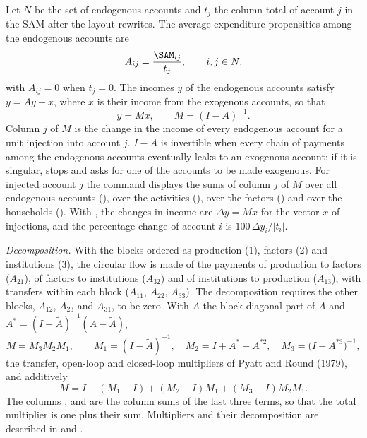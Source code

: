 
Let $N$ be the set of endogenous accounts and $t_j$ the column total of
account $j$ in the SAM after the layout rewrites. The average expenditure
propensities among the endogenous accounts are
\begin{equation*}
A_{ij} = \frac{\SAM_{ij}}{t_j}, \qquad i, j \in N,
\end{equation*}
with $A_{ij} = 0$ when $t_j = 0$. The incomes $y$ of the endogenous accounts
satisfy $y = A y + x$, where $x$ is their income from the exogenous accounts,
so that
\begin{equation*}
y = M x, \qquad M = (I - A)^{-1}.
\end{equation*}
Column $j$ of $M$ is the change in the income of every endogenous account for
a unit injection into account $j$. $I - A$ is invertible when every chain of
payments among the endogenous accounts eventually leaks to an exogenous
account; if it is singular,  stops and asks for one of the
accounts to be made exogenous. For injected account $j$ the command displays
the sums of column $j$ of $M$ over all endogenous accounts (), over
the activities (), over the factors () and over the
households (). With , the changes
in income are $\Delta y = M x$ for the vector $x$ of injections, and the
percentage change of account $i$ is $100\, \Delta y_i / |t_i|$.

\textit{Decomposition.} With the blocks ordered as production (1), factors (2)
and institutions (3), the circular flow is made of the payments of production
to factors ($A_{21}$), of factors to institutions ($A_{32}$) and of
institutions to production ($A_{13}$), with transfers within each block
($A_{11}$, $A_{22}$, $A_{33}$). The decomposition requires the other blocks,
$A_{12}$, $A_{23}$ and $A_{31}$, to be zero. With $\tilde A$ the
block-diagonal part of $A$ and $A^* = (I - \tilde A)^{-1}(A - \tilde A)$,
\begin{equation*}
M = M_3 M_2 M_1, \qquad M_1 = (I - \tilde A)^{-1}, \quad
M_2 = I + A^* + A^{*2}, \quad M_3 = \bigl(I - A^{*3}\bigr)^{-1},
\end{equation*}
the transfer, open-loop and closed-loop multipliers of Pyatt and Round (1979),
and additively
\begin{equation*}
M = I + (M_1 - I) + (M_2 - I) M_1 + (M_3 - I) M_2 M_1 .
\end{equation*}
The columns ,  and  are the column
sums of the last three terms, so that the total multiplier is one plus their
sum. Multipliers and their decomposition are described in
 and .

